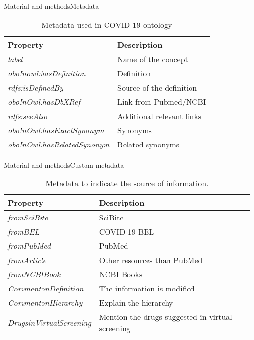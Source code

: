 \documentclass[10pt]{beamer}
\newcommand{\1}{
        	\setbeamertemplate{background}{
        		\texttt{[image: img/1]}
        		\tikz[overlay] \fill[fill opacity=0.75,fill=white] (0,0) rectangle (-\paperwidth,\paperheight);
        	}
}
\begin{document}
\begin{frame}{Material and methods}{Metadata}	
	\begin{table}
		\setlength{\tabcolsep}{0.5em} %
		{\renewcommand{\arraystretch}{1.2}%
		\begin{tabular}{p{4.7cm} p{4.8cm}}			 
			\textbf{Property} & \textbf{Description} \\
			\hline 
			\textit{label} 						& Name of the concept \\
			\textit{oboInowl:hasDefinition} 		& Definition  \\
			\textit{rdfs:isDefinedBy} 			& Source of the definition  \\
			\textit{oboInOwl:hasDbXRef} 			& Link from Pubmed/NCBI  \\
			\textit{rdfs:seeAlso}	 			& Additional relevant links  \\
			\textit{oboInOwl:hasExactSynonym}	& Synonyms  \\
			\textit{oboInOwl:hasRelatedSynonym}	& Related synonyms  \\
			\hline 
		\end{tabular}
	}
\caption{Metadata used in COVID-19 ontology}
	\end{table}	
\end{frame}

\begin{frame}{Material and methods}{Custom metadata}	
	\begin{table}
		\setlength{\tabcolsep}{0.5em} %
		{\renewcommand{\arraystretch}{1.2}%
			\begin{tabular}{p{4.7cm} p{5cm}}			 
				\textbf{Property} & \textbf{Description} \\
				\hline 
				\textit{fromSciBite} 						& SciBite \\
				\textit{fromBEL} 		& COVID-19 BEL  \\
				\textit{fromPubMed} 			& PubMed  \\
				\textit{fromArticle} 			& Other resources than PubMed  \\
				\textit{fromNCBIBook}	 			& NCBI Books  \\
				\textit{CommentonDefinition}	& The information is modified  \\
				\textit{CommentonHierarchy}	& Explain the hierarchy  \\
				\textit{DrugsinVirtualScreening}	& Mention the drugs suggested in virtual screening  \\
				\hline 
			\end{tabular}
		}
	\caption{Metadata to indicate the source of information.}
	\end{table}	
\end{frame}
\end{document}
